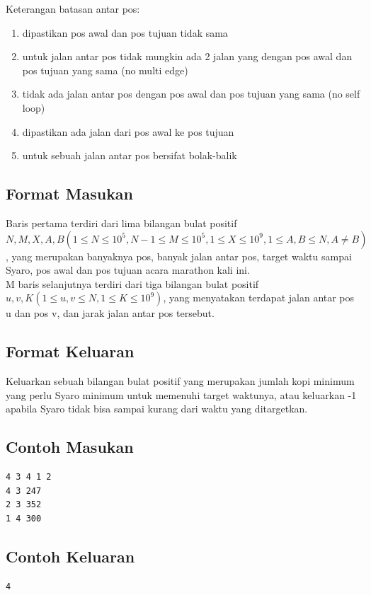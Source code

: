 \documentclass{article}
\begin{document}
Keterangan batasan antar pos:
\begin{enumerate}
    \item dipastikan pos awal dan pos tujuan tidak sama
    \item untuk jalan antar pos tidak mungkin ada 2 jalan yang dengan pos awal dan pos tujuan yang sama (no multi edge)
    \item tidak ada jalan antar pos dengan pos awal dan pos tujuan yang sama (no self loop)
    \item dipastikan ada jalan dari pos awal ke pos tujuan
    \item untuk sebuah jalan antar pos bersifat bolak-balik
\end{enumerate}

\subsection*{Format Masukan}

Baris pertama terdiri dari lima bilangan bulat positif $N, M, X, A, B (1 \leq N \leq 10^5, N-1 \leq M \leq 10^5, 1 \leq X \leq 10^9, 1 \leq A,B \leq N, A \neq B)$, yang merupakan banyaknya pos, banyak jalan antar pos, target waktu sampai Syaro, pos awal dan pos tujuan acara marathon kali ini.\\

M baris selanjutnya terdiri dari tiga bilangan bulat positif $u, v, K (1 \leq u, v \leq N, 1 \leq K \leq 10^9)$, yang menyatakan terdapat jalan antar pos u dan pos v, dan jarak jalan antar pos tersebut.

\subsection*{Format Keluaran}

Keluarkan sebuah bilangan bulat positif yang merupakan jumlah kopi minimum yang perlu Syaro minimum untuk memenuhi target waktunya, atau keluarkan -1 apabila Syaro tidak bisa sampai kurang dari waktu yang ditargetkan.

\begin{multicols}{2}
\subsection*{Contoh Masukan}
\begin{lstlisting}
4 3 4 1 2
4 3 247
2 3 352
1 4 300
\end{lstlisting}
\columnbreak
\subsection*{Contoh Keluaran}
\begin{lstlisting}
4
\end{lstlisting}
\vfill
\null
\end{multicols}
\end{document}
